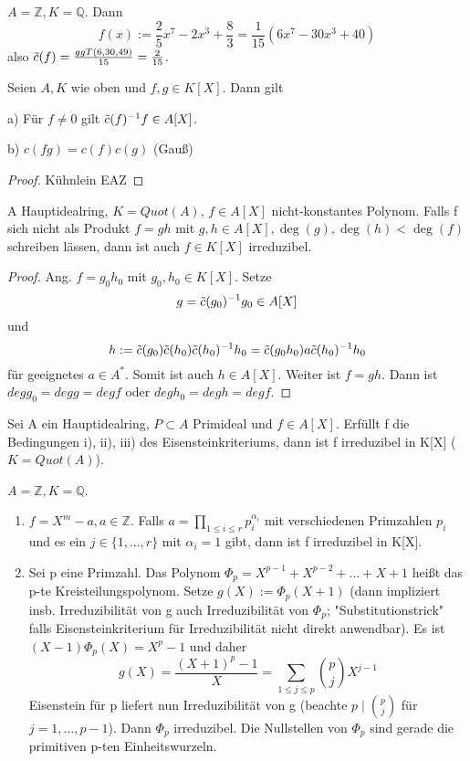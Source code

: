 \documentclass[../main.tex]{subfiles}
\begin{document}
\begin{example*}
    $A = \mathbb{Z}, K = \mathbb{Q}$. Dann
    $$f(x) := \frac{2}{5}x^7 - 2x^3 + \frac{8}{3} = \frac{1}{15}(6x^7 - 30x^3 + 40)$$
    also $\Tilde{c}(f) = \frac{ggT(6,30,49)}{15} = \frac{2}{15}$.
\end{example*}
\begin{lemma}
    Seien $A, K$ wie oben und $f,g \in K[X]$. Dann gilt
    
    a) Für $f \neq 0$ gilt $\Tilde{c}(f)^{-1}f \in A[X]$.

    b) $c(fg) = c(f)c(g)$ (Gauß)
\end{lemma}
\begin{proof}
    Kühnlein EAZ
\end{proof}
\begin{lemma}
    A Hauptidealring, $K = Quot(A)$, $f \in A[X]$ nicht-konstantes Polynom. Falls f sich nicht als Produkt $f = gh$ mit $g,h \in A[X], \deg(g), \deg(h) < \deg(f)$ schreiben lässen, dann ist auch $f \in K[X]$ irreduzibel.
\end{lemma}
\begin{proof}
    Ang. $f = g_0h_0$ mit $g_0, h_0 \in K[X]$. Setze 
    $$g = \Tilde{c}(g_0)^{-1}g_0 \in A[X]$$ und 
    $$h := \Tilde{c}(g_0)\Tilde{c}(h_0)\Tilde{c}(h_0)^{-1}h_0 = \Tilde{c}(g_0h_0)a\Tilde{c}(h_0)^{-1}h_0$$ für geeignetes $a \in A^*$. Somit ist auch $h \in A[X]$. Weiter ist $f = gh$. Dann ist $deg g_0 = deg g = deg f$ oder $deg h_0 = deg h = deg f$.
\end{proof}
\begin{theorem}
    Sei A ein Hauptidealring, $P \subset A$ Primideal und $f \in A[X]$. Erfüllt f die Bedingungen i), ii), iii) des Eisensteinkriteriums, dann ist f irreduzibel in K[X] ($K = Quot(A)$).
\end{theorem}
\begin{example}
    $A = \mathbb{Z}, K = \mathbb{Q}$.

\begin{enumerate}
    \item $f = X^m - a, a \in \mathbb{Z}$. Falls $a = \prod_{1 \leq i \leq r} p_i^{\alpha_i}$ mit verschiedenen Primzahlen $p_i$ und es ein $j \in \{1, ..., r\}$ mit $\alpha_i = 1$ gibt, dann ist f irreduzibel in K[X].
    \item Sei p eine Primzahl. Das Polynom $\Phi_p = X^{p-1} + X^{p-2} + ... + X + 1$ heißt das p-te Kreisteilungspolynom. Setze $g(X) := \Phi_p(X+1)$ (dann impliziert insb. Irreduzibilität von g auch Irreduzibilität von $\Phi_p$; "Substitutionstrick" falls Eisensteinkriterium für Irreduzibilität nicht direkt anwendbar). Es ist $(X-1)\Phi_p(X) = X^p - 1$ und daher 
    $$g(X) = \frac{(X+1)^p - 1}{X} = \sum_{1 \leq j \leq p}\binom{p}{j}X^{j-1}$$
    Eisenstein für p liefert nun Irreduzibilität von g (beachte $p \mid \binom{p}{j}$ für $j = 1,...,p-1$).
    Dann $\Phi_p$ irreduzibel. Die Nullstellen von $\Phi_p$ sind gerade die primitiven p-ten Einheitswurzeln.
\end{enumerate}
\end{example}
\end{document}
